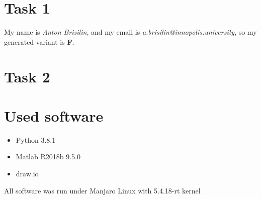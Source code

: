 \documentclass[a4paper,12pt]{article}
\begin{document}
\section{Task 1}
My name is \textit{Anton Brisilin}, and my email is 
\textit{a.brisilin@innopolis.university}, so my generated variant is \textbf{F}.

\section{Task 2}

\section{Used software}
\begin{itemize}
    \item Python 3.8.1
    \item Matlab R2018b 9.5.0
    \item draw.io
\end{itemize}
All software was run under Manjaro Linux with 5.4.18-rt kernel
\end{document}
